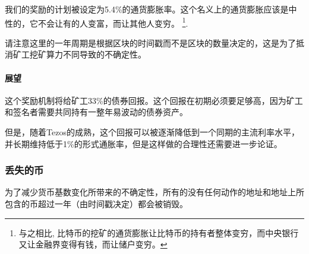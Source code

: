\documentclass[letterpaper]{article}
\begin{document}
我们的奖励的计划被设定为5.4\%的通货膨胀率。这个名义上的通货膨胀应该是中性的，它不会让有的人变富，而让其他人变穷。
\footnote{与之相比, 比特币的挖矿的通货膨胀让比特币的持有者整体变穷，而中央银行又让金融界变得有钱，而让储户变穷。}.

请注意这里的一年周期是根据区块的时间戳而不是区块的数量决定的，这是为了抵消矿工挖矿算力不同导致的不确定性。

\paragraph{展望}
这个奖励机制将给矿工33\%的债券回报。这个回报在初期必须要足够高，因为矿工和签名者需要共同持有一整年易波动的债券资产。

但是，随着Tezos的成熟，这个回报可以被逐渐降低到一个同期的主流利率水平，并长期维持低于1\%的形式通胀率，但是这样做的合理性还需要进一步论证。

\subsubsection{丢失的币}
为了减少货币基数变化所带来的不确定性，所有的没有任何动作的地址和地址上所包含的币超过一年（由时间戳决定）都会被销毁。
\end{document}
